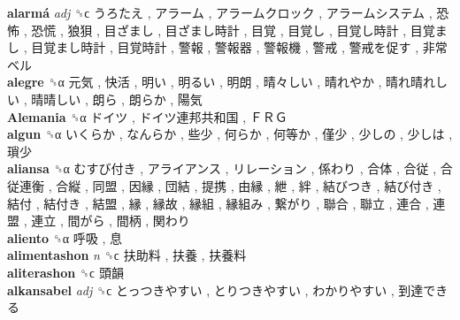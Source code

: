 \textbf{alarmá} \emph{adj}  ␝ϲ   うろたえ ,  アラーム ,  アラームクロック ,  アラームシステム ,  恐怖 ,  恐慌 ,  狼狽 ,  目ざまし ,  目ざまし時計 ,  目覚 ,  目覚し ,  目覚し時計 ,  目覚まし ,  目覚まし時計 ,  目覚時計 ,  警報 ,  警報器 ,  警報機 ,  警戒 ,  警戒を促す ,  非常ベル   \\
\textbf{alegre} ␝α   元気 ,  快活 ,  明い ,  明るい ,  明朗 ,  晴々しい ,  晴れやか ,  晴れ晴れしい ,  晴晴しい ,  朗ら ,  朗らか ,  陽気   \\
\textbf{Alemania} ␝α   ドイツ ,  ドイツ連邦共和国 ,  ＦＲＧ   \\
\textbf{algun} ␝α   いくらか ,  なんらか ,  些少 ,  何らか ,  何等か ,  僅少 ,  少しの ,  少しは ,  瑣少   \\
\textbf{aliansa} ␝α   むすび付き ,  アライアンス ,  リレーション ,  係わり ,  合体 ,  合従 ,  合従連衡 ,  合縦 ,  同盟 ,  因縁 ,  団結 ,  提携 ,  由縁 ,  紲 ,  絆 ,  結びつき ,  結び付き ,  結付 ,  結付き ,  結盟 ,  縁 ,  縁故 ,  縁組 ,  縁組み ,  繋がり ,  聯合 ,  聯立 ,  連合 ,  連盟 ,  連立 ,  間がら ,  間柄 ,  関わり   \\
\textbf{aliento} ␝α   呼吸 ,  息   \\
\textbf{alimentashon} \emph{n}  ␝ϲ   扶助料 ,  扶養 ,  扶養料   \\
\textbf{aliterashon} ␝ϲ   頭韻   \\
\textbf{alkansabel} \emph{adj}  ␝ϲ   とっつきやすい ,  とりつきやすい ,  わかりやすい ,  到達できる   \\
